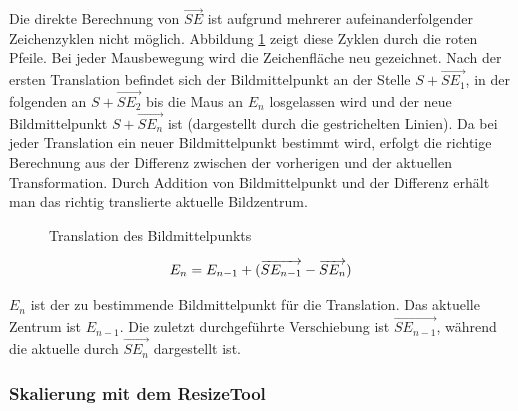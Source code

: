 Die direkte Berechnung von $\overrightarrow{SE}$ ist aufgrund mehrerer aufeinanderfolgender Zeichenzyklen nicht möglich. Abbildung \ref{movetool} zeigt diese Zyklen durch die roten Pfeile. Bei jeder Mausbewegung wird die Zeichenfläche neu gezeichnet. 
Nach der ersten Translation befindet sich der Bildmittelpunkt an der Stelle $S + \overrightarrow{SE_1}$, in der folgenden an $S + \overrightarrow{SE_2}$ bis die Maus an $E_n$ losgelassen wird und der neue Bildmittelpunkt $S + \overrightarrow{SE_n}$ ist (dargestellt durch die gestrichelten Linien). Da bei jeder Translation ein neuer Bildmittelpunkt bestimmt wird, erfolgt die richtige Berechnung aus der Differenz zwischen der vorherigen und der aktuellen Transformation. Durch Addition von Bildmittelpunkt und der Differenz erhält man das richtig translierte aktuelle Bildzentrum.
\begin{figure}[htbp]
  \vspace{0.5cm}
  \centering
   \caption{Translation des Bildmittelpunkts}
  \label{movetool}
  \vspace{0.5cm}
\end{figure}



\begin{equation}
E_n= E_{n-1} + (\overrightarrow{SE_{n-1}}-\overrightarrow{SE_n})
\vspace{0.5cm}
\end{equation}

$E_n$ ist der zu bestimmende Bildmittelpunkt für die Translation. Das aktuelle Zentrum ist $E_{n-1}$. Die zuletzt durchgeführte Verschiebung ist $\overrightarrow{SE_{n-1}}$, während die aktuelle durch $\overrightarrow{SE_n}$ dargestellt ist.

\FloatBarrier
\subsubsection{Skalierung mit dem ResizeTool}

